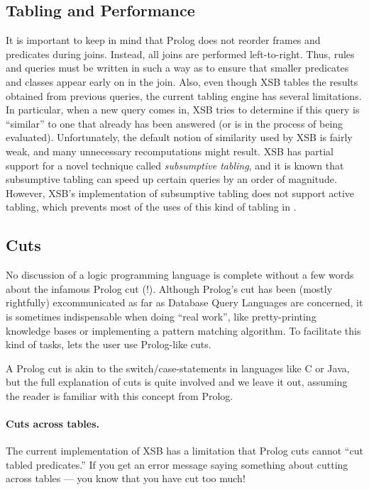 \documentclass[11pt]{article}
\newcommand{\ERGO}{\mbox{\smaller{\ensuremath{\cal{E}}\smaller{{\sc{RGO}}}}}\xspace}
\newcommand{\FLSYSTEM}{\ERGO}
\begin{document}
\subsection{Tabling and Performance}

It is important to keep in mind that Prolog does not reorder frames
and predicates during joins. Instead, all joins are performed
left-to-right.  Thus, rules and queries must be written in such a way as to
ensure that smaller predicates and classes appear early on in the join.
Also, even though XSB tables the results obtained from previous queries,
the current tabling engine has several limitations. In particular, when a
new query comes in, XSB tries to determine if this query is ``similar'' to
one that already has been answered (or is in the process of being
evaluated).  Unfortunately, the default notion of similarity used by XSB is
fairly weak, and many unnecessary recomputations might result. XSB has
partial support for a
novel technique called \emph{subsumptive tabling}, and
it is known that subsumptive tabling can speed up
certain queries by an order of magnitude. However, XSB's implementation
of subsumptive tabling does not support active tabling, which prevents
most of the uses of this kind of tabling in \FLSYSTEM.


\subsection{Cuts}


\index{cut ("!) !in \FLSYSTEM}
No discussion of a logic programming language is complete without a few
words about the infamous Prolog cut (!). Although Prolog's cut has been
(mostly rightfully) excommunicated as far as Database Query Languages are
concerned, it is sometimes indispensable when doing ``real work'', like
pretty-printing \FLSYSTEM knowledge bases or implementing a pattern matching
algorithm.  To facilitate this kind of tasks, \FLSYSTEM lets the user
use Prolog-like cuts. 

A Prolog cut is akin to the switch/case-statements in languages
like C or Java, but the full explanation of cuts is quite involved
and we leave it out, assuming the reader is familiar with this concept from
Prolog.

\paragraph{Cuts across tables.}
The current implementation of XSB has a limitation that
Prolog cuts cannot ``cut tabled predicates.''  If you get an error
message saying something about cutting across tables --- you know that
you have cut too much!
\end{document}
